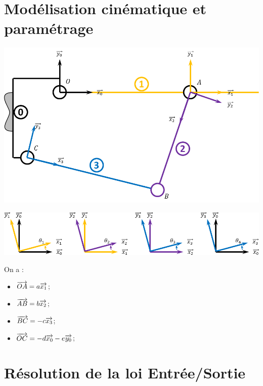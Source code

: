 \documentclass[10pt,fleqn]{article} %
\begin{document}

\vspace{2cm}
\pagestyle{fancy}
\thispagestyle{plain}



\section{Modélisation cinématique et paramétrage}
\begin{center}
\includegraphics[width=.5\textwidth]{images/Schema}
\end{center}

\begin{center}
\includegraphics[width=\textwidth]{images/Parametrage}
\end{center}

On a : 
\begin{multicols}{2}
\begin{itemize}
\item $\overrightarrow{OA} = a \overrightarrow{x_{1}}$;
\item $\overrightarrow{AB} = b \overrightarrow{x_{2}}$;
\item $\overrightarrow{BC} = -c \overrightarrow{x_{3}}$;
\item $\overrightarrow{OC} = -d \overrightarrow{x_{0}}-e\overrightarrow{y_{0}}$;
\end{itemize}
\end{multicols}

\section{Résolution de la loi Entrée/Sortie}
\end{document}

